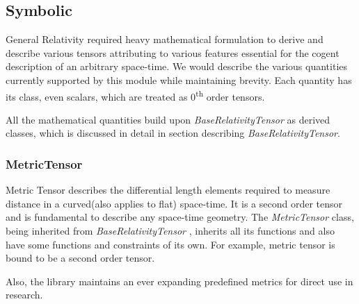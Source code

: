 \documentclass[onecolumn]{aa}
\begin{document}
\subsection{Symbolic}
General Relativity required heavy mathematical formulation to derive and describe various tensors attributing to various features essential for the cogent description of an arbitrary space-time. We would describe the various quantities currently supported by this module while maintaining brevity. Each quantity has its class, even scalars, which are treated as 0\textsuperscript{th} order tensors.

All the mathematical quantities build upon \textit{BaseRelativityTensor} as derived classes, which is discussed in detail in section describing \textit{BaseRelativityTensor}.

\subsubsection{MetricTensor}
Metric Tensor describes the differential length elements required to measure distance in a curved(also applies to flat) space-time. It is a second order tensor and is fundamental to describe any space-time geometry. The \textit{MetricTensor} class, being inherited from  \textit{BaseRelativityTensor} , inherits all its functions and also have some functions and constraints of its own. For example, metric tensor is bound to be a second order tensor.


Also, the library maintains an ever expanding predefined metrics for direct use in research.


\end{document}
